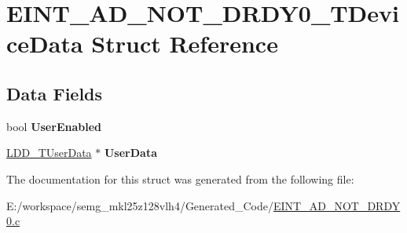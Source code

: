 \hypertarget{struct_e_i_n_t___a_d___n_o_t___d_r_d_y0___t_device_data}{\section{E\-I\-N\-T\-\_\-\-A\-D\-\_\-\-N\-O\-T\-\_\-\-D\-R\-D\-Y0\-\_\-\-T\-Device\-Data Struct Reference}
\label{struct_e_i_n_t___a_d___n_o_t___d_r_d_y0___t_device_data}
}
\subsection*{Data Fields}
\begin{DoxyCompactItemize}
\item 
\hypertarget{struct_e_i_n_t___a_d___n_o_t___d_r_d_y0___t_device_data_aa9591e16163a22375d8f64557a37bcb1}{bool {\bfseries User\-Enabled}}\label{struct_e_i_n_t___a_d___n_o_t___d_r_d_y0___t_device_data_aa9591e16163a22375d8f64557a37bcb1}

\item 
\hypertarget{struct_e_i_n_t___a_d___n_o_t___d_r_d_y0___t_device_data_add2ca70680d3cb43c22507fa1ad7f7ed}{\hyperlink{group___p_e___types__module_ga0b66a73f87238a782318aa0be7578e35}{L\-D\-D\-\_\-\-T\-User\-Data} $\ast$ {\bfseries User\-Data}}\label{struct_e_i_n_t___a_d___n_o_t___d_r_d_y0___t_device_data_add2ca70680d3cb43c22507fa1ad7f7ed}

\end{DoxyCompactItemize}


The documentation for this struct was generated from the following file\-:\begin{DoxyCompactItemize}
\item 
E\-:/workspace/semg\-\_\-mkl25z128vlh4/\-Generated\-\_\-\-Code/\hyperlink{_e_i_n_t___a_d___n_o_t___d_r_d_y0_8c}{E\-I\-N\-T\-\_\-\-A\-D\-\_\-\-N\-O\-T\-\_\-\-D\-R\-D\-Y0.\-c}\end{DoxyCompactItemize}
